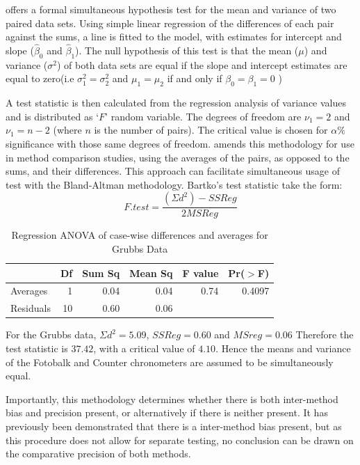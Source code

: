 \documentclass[12pt, a4paper]{report}
\theoremstyle{plain}
\theoremstyle{definition}
\theoremstyle{remark}
\begin{document}
\citet{BB89} offers a formal simultaneous hypothesis test for the
mean and variance of two paired data sets. Using simple linear
regression of the differences of each pair against the sums, a
line is fitted to the model, with estimates for intercept and
slope ($\hat{\beta}_{0}$ and $\hat{\beta}_{1}$). The null
hypothesis of this test is that the mean ($\mu$) and variance
($\sigma^{2}$) of both data sets are equal if the slope and
intercept estimates are equal to zero(i.e $\sigma^{2}_{1} =
\sigma^{2}_{2}$ and $\mu_{1}=\mu_{2}$ if and only if $\beta_{0}=
\beta_{1}=0$ )

A test statistic is then calculated from the regression analysis
of variance values \citep{BB89} and is distributed as `$F$' random
variable. The degrees of freedom are $\nu_{1}=2$ and $\nu_{1}=n-2$
(where $n$ is the number of pairs). The critical value is chosen
for $\alpha\%$ significance with those same degrees of freedom.
\citet{Bartko} amends this methodology for use in method
comparison studies, using the averages of the pairs, as opposed to
the sums, and their differences. This approach can facilitate
simultaneous usage of test with the Bland-Altman methodology.
Bartko's test statistic take the form:
\[ F.test = \frac{(\Sigma d^{2})-SSReg}{2MSReg}
\]
\begin{table}[ht]
	\begin{center}
		\begin{tabular}{lrrrrr}
			\hline
			& Df & Sum Sq & Mean Sq & F value & Pr($>$F) \\
			\hline
			Averages & 1 & 0.04 & 0.04 & 0.74 & 0.4097 \\
			Residuals & 10 & 0.60 & 0.06 &  &  \\
			\hline
		\end{tabular}
		\caption{Regression ANOVA of case-wise differences and averages
			for Grubbs Data}
	\end{center}
\end{table}

For the Grubbs data, $\Sigma d^{2}=5.09 $, $SSReg = 0.60$ and
$MSreg=0.06$ Therefore the test statistic is $37.42$, with a
critical value of $4.10$. Hence the means and variance of the
Fotobalk and Counter chronometers are assumed to be simultaneously
equal.

Importantly, this methodology determines whether there is both
inter-method bias and precision present, or alternatively if there
is neither present. It has previously been demonstrated that there
is a inter-method bias present, but as this procedure does not
allow for separate testing, no conclusion can be drawn on the
comparative precision of both methods.
\end{document}
